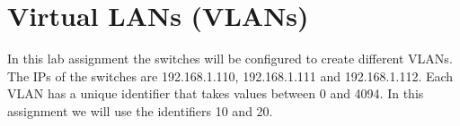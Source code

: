 \chapter{Virtual LANs (VLANs)}

In this lab assignment the switches will be configured to create different VLANs.
The IPs of the switches are 192.168.1.110, 192.168.1.111 and 192.168.1.112.
Each VLAN has a unique identifier that takes values between 0 and 4094. 
In this assignment we will use the identifiers 10 and 20.
